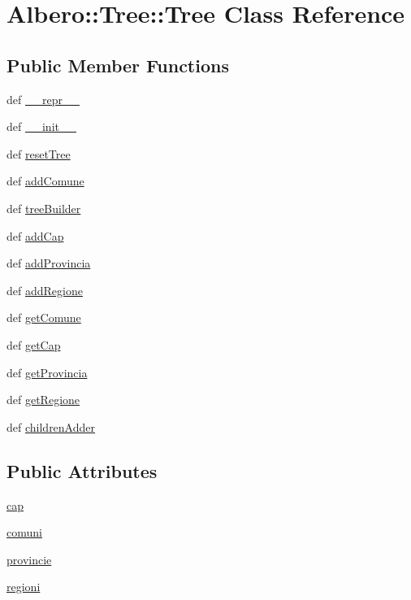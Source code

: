 \hypertarget{classAlbero_1_1Tree_1_1Tree}{
\section{Albero::Tree::Tree Class Reference}
\label{classAlbero_1_1Tree_1_1Tree}
}
\subsection*{Public Member Functions}
\begin{DoxyCompactItemize}
\item 
def \hyperlink{classAlbero_1_1Tree_1_1Tree_a1404233dba530fa3cde1a3e55c5037cb}{\_\-\_\-repr\_\-\_\-}
\item 
def \hyperlink{classAlbero_1_1Tree_1_1Tree_ac14a4e381d22bc6ec0e26460997f57b9}{\_\-\_\-init\_\-\_\-}
\item 
def \hyperlink{classAlbero_1_1Tree_1_1Tree_ad4408c6beb8e74e5c249d277b16a3aea}{resetTree}
\item 
def \hyperlink{classAlbero_1_1Tree_1_1Tree_a46930260f6de704073f497bdaf50cf1c}{addComune}
\item 
def \hyperlink{classAlbero_1_1Tree_1_1Tree_afd421cb896582eddae2cb99d14dd062e}{treeBuilder}
\item 
def \hyperlink{classAlbero_1_1Tree_1_1Tree_aa4102efcf928a12c478faf33cb9e3335}{addCap}
\item 
def \hyperlink{classAlbero_1_1Tree_1_1Tree_a0c68c02fb31afbee825b4c3ce6152589}{addProvincia}
\item 
def \hyperlink{classAlbero_1_1Tree_1_1Tree_a7afd5fbab5db1c719c4a82a9efd8067e}{addRegione}
\item 
def \hyperlink{classAlbero_1_1Tree_1_1Tree_a26f5cddab2f64e173b713a2fc0c6aa2e}{getComune}
\item 
def \hyperlink{classAlbero_1_1Tree_1_1Tree_ab1c74ce602a96cb814a4e602905033a5}{getCap}
\item 
def \hyperlink{classAlbero_1_1Tree_1_1Tree_aca9a9b61e909074b7a00cf40380e89f6}{getProvincia}
\item 
def \hyperlink{classAlbero_1_1Tree_1_1Tree_a1020027b1406e35083243a70b3855175}{getRegione}
\item 
def \hyperlink{classAlbero_1_1Tree_1_1Tree_a5d1fddeaf3b14f105aa6d64fd0c7d33c}{childrenAdder}
\end{DoxyCompactItemize}
\subsection*{Public Attributes}
\begin{DoxyCompactItemize}
\item 
\hyperlink{classAlbero_1_1Tree_1_1Tree_af3f83504cf082249fb0c489774bf74f7}{cap}
\item 
\hyperlink{classAlbero_1_1Tree_1_1Tree_a7ac08ca8bb38d2c42b81fe515a51ae50}{comuni}
\item 
\hyperlink{classAlbero_1_1Tree_1_1Tree_a7f1a48821bdeac43b35b1da08a42c3a4}{provincie}
\item 
\hyperlink{classAlbero_1_1Tree_1_1Tree_a56d533d8193d33bbad99b964ee94e5b5}{regioni}
\end{DoxyCompactItemize}


